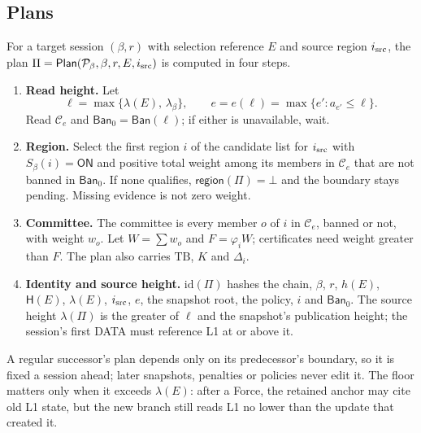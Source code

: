 \documentclass[11pt,a4paper]{article}
\newcommand{\Hash}{\mathsf H}
\newcommand{\tagg}[1]{\mathsf{#1}}
\newcommand{\cfg}{\mathcal C}
\newcommand{\Ban}{\mathsf{Ban}}
\begin{document}
\subsection{Plans}
\label{sec:plan}
For a target session $(\beta,r)$ with selection reference $E$ and source
region $i_{\rm src}$, the plan
$\Pi=\tagg{Plan}(\mathcal P_\beta,\beta,r,E,i_{\rm src})$ is computed in
four steps.
\begin{enumerate}[label=\textbf{\arabic*.},itemsep=3pt]
\item \textbf{Read height.} Let
\begin{equation}\label{eq:read}
 \ell=\max\{\lambda(E),\,\lambda_\beta\},\qquad
 e=e(\ell)=\max\{e':a_{e'}\le\ell\}.
\end{equation}
Read $\cfg_e$ and $\Ban_0=\Ban(\ell)$; if either is unavailable, wait.
\item \textbf{Region.} Select the first region $i$ of the candidate list
for $i_{\rm src}$ with
$S_\beta(i)=\tagg{ON}$ and positive total weight among its members in
$\cfg_e$ that are not banned in $\Ban_0$. If none qualifies,
$\tagg{region}(\Pi)=\bot$ and the boundary stays pending. Missing evidence
is not zero weight.
\item \textbf{Committee.} The committee is every member $o$ of $i$ in
$\cfg_e$, banned or not, with weight $w_o$. Let $W=\sum w_o$ and
$F=\varphi_iW$; certificates need weight greater than $F$. The plan also
carries $\mathrm{TB}$, $K$ and $\Delta_i$.
\item \textbf{Identity and source height.} $\mathrm{id}(\Pi)$ hashes the
chain, $\beta$, $r$, $h(E)$, $\Hash(E)$, $\lambda(E)$,
$i_{\rm src}$, $e$, the snapshot root, the policy, $i$ and $\Ban_0$. The
source height $\lambda(\Pi)$ is the greater of $\ell$ and the snapshot's
publication height; the session's first DATA must reference L1 at or
above it.
\end{enumerate}
A regular successor's plan depends only on its predecessor's boundary,
so it is fixed a session ahead; later snapshots, penalties or policies
never edit it. The floor matters only when it exceeds $\lambda(E)$: after a
Force, the retained anchor may cite old L1 state, but the new branch still
reads L1 no lower than the update that created it.
\end{document}
